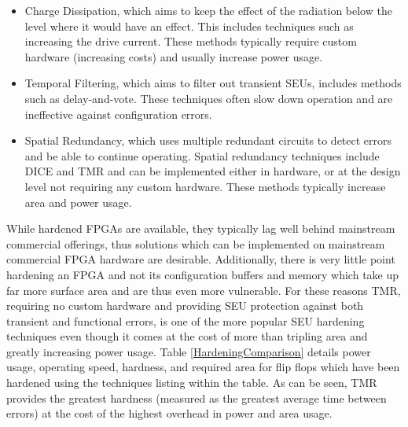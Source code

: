 \documentclass[12pt,final,oneside,a4paper]{dwThesis} %
\begin{document}
   \begin{itemize}

      \item Charge Dissipation, which aims to keep the effect of the radiation
         below the level where it would have an effect. This includes
         techniques such as increasing the drive current. These methods
         typically require custom hardware (increasing costs) and usually
         increase power usage.
      \item Temporal Filtering, which aims to filter out transient \glspl{SEU},
         includes methods such as delay-and-vote\cite{HardeningTechniques}.
         These techniques often slow down operation and are ineffective
         against configuration errors.
      \item Spatial Redundancy, which uses multiple redundant circuits to
         detect errors and be able to continue operating. Spatial redundancy
         techniques include \gls{DICE}\cite{DICE} and \gls{TMR} and can be
         implemented either in hardware, or at the design level not
         requiring any custom hardware. These methods typically increase
         area and power usage.  
   \end{itemize}
   While hardened \glspl{FPGA}
   are available, they typically lag well behind mainstream commercial
   offerings\cite{VFPGATMR}, thus solutions which can be implemented on
   mainstream commercial \gls{FPGA} hardware are desirable. Additionally,
   there is very little point hardening an \gls{FPGA} and not its
   configuration buffers and memory which take up far more surface
   area\cite{FPGAArch} and are thus even more vulnerable.  For these reasons
   \gls{TMR}, requiring no custom hardware and providing \gls{SEU}
   protection against both transient and functional errors, is one of the
   more popular \gls{SEU} hardening techniques even though it comes at the
   cost of more than tripling area and greatly increasing power usage.
   Table \ref{HardeningComparison} details power usage, operating speed,
   hardness, and required area for flip flops which have been hardened using
   the techniques listing within the table. As can be seen, \gls{TMR} provides the greatest hardness
   (measured as the greatest average time between errors) at the cost of the highest overhead in power and area usage.
\end{document}

